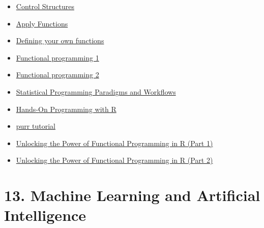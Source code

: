\documentclass[
  letterpaper,
  DIV=11,
  numbers=noendperiod]{scrreprt}
\providecommand{\tightlist}{%
  \setlength{\itemsep}{0pt}\setlength{\parskip}{0pt}}\usepackage{longtable,booktabs,array}
\begin{document}
\begin{itemize}
\tightlist
\item
  \href{https://cran.r-project.org/doc/manuals/r-release/R-lang.html\#Control-structures}{Control
  Structures}
\item
  \href{https://www.rdocumentation.org/packages/base/versions/3.6.2/topics/apply}{Apply
  Functions}
\item
  \href{https://modern-rstats.eu/defining-your-own-functions.html}{Defining
  your own functions}
\item
  \href{https://modern-rstats.eu/functional-programming.html}{Functional
  programming 1}
\item
  \href{http://adv-r.had.co.nz/Functional-programming.html}{Functional
  programming 2}
\item
  \href{https://www.stephaniehicks.com/jhustatprogramming2022/schedule}{Statistical
  Programming Paradigms and Workflows}
\item
  \href{https://jjallaire.github.io/hopr/}{Hands-On Programming with R}
\item
  \href{https://jennybc.github.io/purrr-tutorial/index.html}{purr
  tutorial}
\item
  \href{https://appsilon.com/functional-programming-in-r-part-1/}{Unlocking
  the Power of Functional Programming in R (Part 1)}
\item
  \href{https://appsilon.com/functional-programming-in-r-part-2/}{Unlocking
  the Power of Functional Programming in R (Part 2)}
\end{itemize}

\section{13. Machine Learning and Artificial
Intelligence}\label{machine-learning-and-artificial-intelligence}
\end{document}
